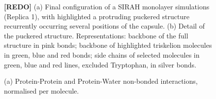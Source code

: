 \begin{figure}[h!]
\centering
{}
\caption[Snapshot of SIRAH monolayer simulation]{\textbf{[REDO]} (a) Final configuration of a SIRAH monolayer simulations (Replica 1), with highlighted a protruding puckered structure recurrently occurring several positions of the capsule. (b) Detail of the puckered structure. Representations: backbone of the full structure in pink bonds; backbone of highlighted triskelion molecules in green, blue and red bonds; side chains of selected molecules in green, blue and red lines, excluded Tryptophan, in silver bonds.}
\label{fig:sirah_mono_pic}
\end{figure}


\begin{figure}[p!]
\centering
{} 
\caption[Non-bonded protein energy contribution to capsule structures]{(a) Protein-Protein and Protein-Water non-bonded interactions, normalised per molecule.}
\label{fig:eng_cg}
\end{figure}







